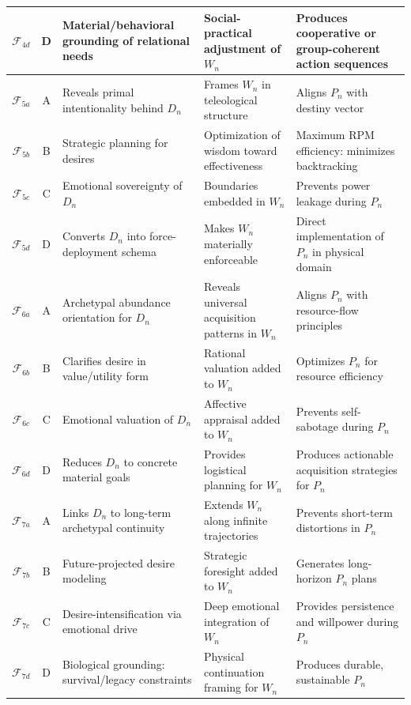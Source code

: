 \documentclass[11pt,twoside,openright]{book}
\theoremstyle{definition}
\theoremstyle{plain}
\theoremstyle{remark}
\newcommand{\Foundations}{\mathcal{F}}
\begin{document}
\begin{longtable}{c|c|p{3.5cm}|p{3.5cm}|p{4cm}}
$\Foundations_{4d}$ & D & Material/behavioral grounding of relational needs
& Social-practical adjustment of $W_n$
& Produces cooperative or group-coherent action sequences \\

\midrule

$\Foundations_{5a}$ & A & Reveals primal intentionality behind $D_n$
& Frames $W_n$ in teleological structure
& Aligns $P_n$ with destiny vector \\

$\Foundations_{5b}$ & B & Strategic planning for desires
& Optimization of wisdom toward effectiveness
& Maximum RPM efficiency: minimizes backtracking \\

$\Foundations_{5c}$ & C & Emotional sovereignty of $D_n$
& Boundaries embedded in $W_n$
& Prevents power leakage during $P_n$ \\

$\Foundations_{5d}$ & D & Converts $D_n$ into force-deployment schema
& Makes $W_n$ materially enforceable
& Direct implementation of $P_n$ in physical domain \\

\midrule

$\Foundations_{6a}$ & A & Archetypal abundance orientation for $D_n$
& Reveals universal acquisition patterns in $W_n$
& Aligns $P_n$ with resource-flow principles \\

$\Foundations_{6b}$ & B & Clarifies desire in value/utility form
& Rational valuation added to $W_n$
& Optimizes $P_n$ for resource efficiency \\

$\Foundations_{6c}$ & C & Emotional valuation of $D_n$
& Affective appraisal added to $W_n$
& Prevents self-sabotage during $P_n$ \\

$\Foundations_{6d}$ & D & Reduces $D_n$ to concrete material goals
& Provides logistical planning for $W_n$
& Produces actionable acquisition strategies for $P_n$ \\

\midrule

$\Foundations_{7a}$ & A & Links $D_n$ to long-term archetypal continuity
& Extends $W_n$ along infinite trajectories
& Prevents short-term distortions in $P_n$ \\

$\Foundations_{7b}$ & B & Future-projected desire modeling
& Strategic foresight added to $W_n$
& Generates long-horizon $P_n$ plans \\

$\Foundations_{7c}$ & C & Desire-intensification via emotional drive
& Deep emotional integration of $W_n$
& Provides persistence and willpower during $P_n$ \\

$\Foundations_{7d}$ & D & Biological grounding: survival/legacy constraints
& Physical continuation framing for $W_n$
& Produces durable, sustainable $P_n$ \\

\end{longtable}
\end{document}
